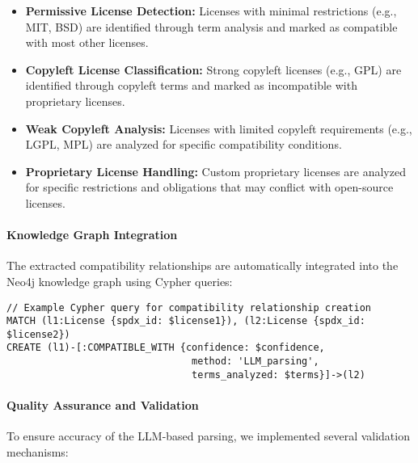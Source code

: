 \begin{itemize}
    \item \textbf{Permissive License Detection:} Licenses with minimal restrictions (e.g., MIT, BSD) are identified through term analysis and marked as compatible with most other licenses.
    \item \textbf{Copyleft License Classification:} Strong copyleft licenses (e.g., GPL) are identified through copyleft terms and marked as incompatible with proprietary licenses.
    \item \textbf{Weak Copyleft Analysis:} Licenses with limited copyleft requirements (e.g., LGPL, MPL) are analyzed for specific compatibility conditions.
    \item \textbf{Proprietary License Handling:} Custom proprietary licenses are analyzed for specific restrictions and obligations that may conflict with open-source licenses.
\end{itemize}

\paragraph{Knowledge Graph Integration}
The extracted compatibility relationships are automatically integrated into the Neo4j knowledge graph using Cypher queries:

\begin{verbatim}
// Example Cypher query for compatibility relationship creation
MATCH (l1:License {spdx_id: $license1}), (l2:License {spdx_id: $license2})
CREATE (l1)-[:COMPATIBLE_WITH {confidence: $confidence, 
                                method: 'LLM_parsing', 
                                terms_analyzed: $terms}]->(l2)
\end{verbatim}

\paragraph{Quality Assurance and Validation}
To ensure accuracy of the LLM-based parsing, we implemented several validation mechanisms:

